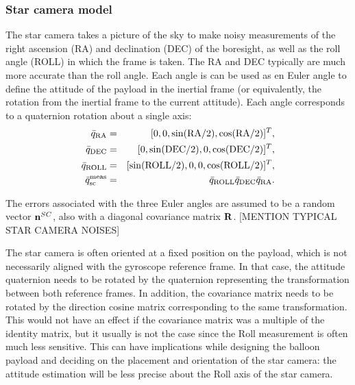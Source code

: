 \subsubsection{Star camera model}

The star camera takes a picture of the sky to make noisy measurements of the right ascension (RA) and declination (DEC) of the boresight, as well as the roll angle (ROLL) in which the frame is taken. The RA and DEC typically are much more accurate than the roll angle. Each angle is can be used as en Euler angle to define the attitude of the payload in the inertial frame (or equivalently, the rotation from the inertial frame to the current attitude). Each angle corresponds to a quaternion rotation about a single axis: 
\begin{eqnarray}
\bar{q}_\textrm{RA} &=& [0, 0, \sin(\textrm{RA}/2),\cos(\textrm{RA}/2)]^T,\\
\bar{q}_\textrm{DEC} &=& [ 0, \sin(\textrm{DEC}/2), 0,\cos(\textrm{DEC}/2)]^T,\\
\bar{q}_\textrm{ROLL}& = &[  \sin(\textrm{ROLL}/2),0,0,\cos(\textrm{ROLL}/2)]^T,\\
\bar{q}^{\textrm{meas}}_{\textrm{sc}}& = &\bar{q}_\textrm{ROLL}\bar{q}_\textrm{DEC}\bar{q}_\textrm{RA}.
\end{eqnarray}

The errors associated with the three Euler angles are assumed to be a random vector $\textbf{n}^{SC}$, also with a diagonal covariance matrix $\textrm{\textbf{R}}$. [MENTION TYPICAL STAR CAMERA NOISES]

The star camera is often oriented at a fixed position on the payload, which is not necessarily aligned with the gyroscope reference frame. In that case, the attitude quaternion needs to be rotated by the quaternion representing the transformation between both reference frames. In addition, the covariance matrix needs to be rotated by the direction cosine matrix corresponding to the same transformation. This would not have an effect if the covariance matrix was a multiple of the identity matrix, but it usually is not the case since the Roll measurement is often much less sensitive. This can have implications while designing the balloon payload and deciding on the placement and orientation of the star camera: the attitude estimation will be less precise about the Roll axis of the star camera.


